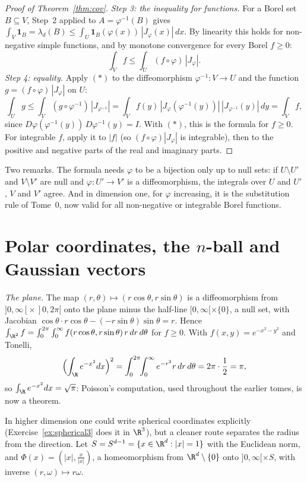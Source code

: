 \begin{proof}[Proof of Theorem~\ref{thm:cov}]
\emph{Step 3: the inequality for functions.} For a Borel set $B\subseteq V$, Step~2 applied to $A=\varphi^{-1}(B)$ gives
$\int_V\mathbf 1_B=\lambda_d(B)\le\int_U\mathbf 1_B(\varphi(x))\,|J_\varphi(x)|\,dx$. By linearity this holds for non-negative simple functions, and by monotone convergence for every Borel $f\ge0$:
\[\int_Vf\le\int_U(f\circ\varphi)\,|J_\varphi|.\tag{$*$}\]
\emph{Step 4: equality.} Apply $(*)$ to the diffeomorphism $\varphi^{-1}:V\to U$ and the function $g=(f\circ\varphi)\,|J_\varphi|$ on $U$:
\[\int_Ug\le\int_V(g\circ\varphi^{-1})\,|J_{\varphi^{-1}}|=\int_Vf(y)\,|J_\varphi(\varphi^{-1}(y))|\,|J_{\varphi^{-1}}(y)|\,dy=\int_Vf,\]
since $D\varphi(\varphi^{-1}(y))\,D\varphi^{-1}(y)=I$. With $(*)$, this is the formula for $f\ge0$. For integrable $f$, apply it to $|f|$ (so $(f\circ\varphi)|J_\varphi|$ is integrable), then to the positive and
negative parts of the real and imaginary parts.
\end{proof}

Two remarks. The formula needs $\varphi$ to be a bijection only up to null sets: if $U\setminus U'$ and $V\setminus V'$ are null and $\varphi:U'\to V'$ is a diffeomorphism, the integrals over $U$ and $U'$, $V$ and $V'$
agree. And in dimension one, for $\varphi$ increasing, it is the substitution rule of Tome~0, now valid for all non-negative or integrable Borel functions.

\section{Polar coordinates, the \texorpdfstring{$n$}{n}-ball and Gaussian vectors}

\emph{The plane.} The map $(r,\theta)\mapsto(r\cos\theta,r\sin\theta)$ is a diffeomorphism from $]0,\infty[\times\,]0,2\pi[$ onto the plane minus the half-line $[0,\infty[\times\{0\}$, a null set, with Jacobian
$\cos\theta\cdot r\cos\theta-(-r\sin\theta)\sin\theta=r$. Hence $\int_{\R^2}f=\int_0^{2\pi}\int_0^\infty f(r\cos\theta,r\sin\theta)\,r\,dr\,d\theta$ for $f\ge0$. With $f(x,y)=e^{-x^2-y^2}$ and Tonelli,
\[\Bigl(\int_\R e^{-x^2}dx\Bigr)^2=\int_0^{2\pi}\!\!\int_0^\infty e^{-r^2}r\,dr\,d\theta=2\pi\cdot\frac12=\pi,\]
so $\int_\R e^{-x^2}dx=\sqrt\pi$: Poisson's computation, used throughout the earlier tomes, is now a theorem.

In higher dimension one could write spherical coordinates explicitly (Exercise~\ref{ex:spherical3} does it in $\R^3$), but a cleaner route separates the radius from the direction. Let
$S=S^{d-1}=\{x\in\R^d:|x|=1\}$ with the Euclidean norm, and $\Phi(x)=(|x|,\frac x{|x|})$, a homeomorphism from $\R^d\setminus\{0\}$ onto $]0,\infty[\times S$, with inverse $(r,\omega)\mapsto r\omega$.


